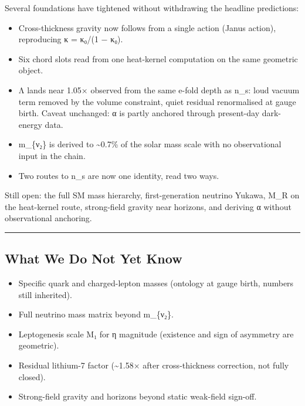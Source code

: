\documentclass[
  11pt,
]{article}
\providecommand{\tightlist}{%
  \setlength{\itemsep}{0pt}\setlength{\parskip}{0pt}}
\begin{document}
Several foundations have tightened without withdrawing the headline
predictions:

\begin{itemize}
\tightlist
\item
  Cross-thickness gravity now follows from a single action (Janus
  action), reproducing κ = κ₀/(1 − κ₀).
\item
  Six chord slots read from one heat-kernel computation on the same
  geometric object.
\item
  Λ lands near 1.05× observed from the same e-fold depth as n\_s: loud
  vacuum term removed by the volume constraint, quiet residual
  renormalised at gauge birth. Caveat unchanged: α is partly anchored
  through present-day dark-energy data.
\item
  m\_\{ν₂\} is derived to \textasciitilde0.7\% of the solar mass scale
  with no observational input in the chain.
\item
  Two routes to n\_s are now one identity, read two ways.
\end{itemize}

Still open: the full SM mass hierarchy, first-generation neutrino
Yukawa, M\_R on the heat-kernel route, strong-field gravity near
horizons, and deriving α without observational anchoring.

\begin{center}\rule{0.5\linewidth}{0.5pt}\end{center}

\subsection{What We Do Not Yet Know}\label{what-we-do-not-yet-know}

\begin{itemize}
\tightlist
\item
  Specific quark and charged-lepton masses (ontology at gauge birth,
  numbers still inherited).
\item
  Full neutrino mass matrix beyond m\_\{ν₂\}.
\item
  Leptogenesis scale M₁ for η magnitude (existence and sign of asymmetry
  are geometric).
\item
  Residual lithium-7 factor (\textasciitilde1.58× after cross-thickness
  correction, not fully closed).
\item
  Strong-field gravity and horizons beyond static weak-field sign-off.
\end{itemize}
\end{document}

